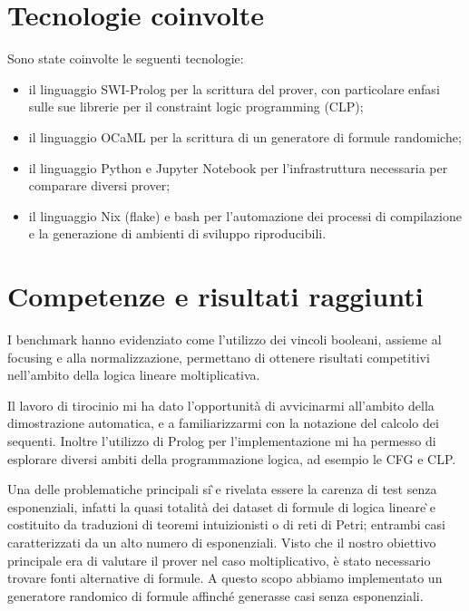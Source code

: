 \documentclass[a4paper, 12pt, italian]{extarticle}
\begin{document}
\section{Tecnologie coinvolte}
Sono state coinvolte le seguenti tecnologie:
\begin{itemize}
	\item il linguaggio SWI-Prolog per la scrittura del prover, con particolare enfasi sulle sue librerie per il constraint logic programming (CLP);
	\item il linguaggio OCaML per la scrittura di un generatore di formule randomiche;
	\item il linguaggio Python e Jupyter Notebook per l’infrastruttura necessaria per comparare diversi prover;
	\item il linguaggio Nix (flake) e bash per l’automazione dei processi di compilazione e la
generazione di ambienti di sviluppo riproducibili.
\end{itemize}

\section{Competenze e risultati raggiunti}
I benchmark hanno evidenziato come l’utilizzo dei vincoli booleani, assieme al focusing e alla normalizzazione, permettano di ottenere risultati competitivi nell’ambito della logica lineare moltiplicativa.

Il lavoro di tirocinio mi ha dato l’opportunità di avvicinarmi all’ambito della dimostrazione automatica, e a familiarizzarmi con la notazione del calcolo dei sequenti.
Inoltre l’utilizzo di Prolog per l’implementazione mi ha permesso di esplorare diversi ambiti della programmazione logica, ad esempio le CFG e CLP.

Una delle problematiche principali si ̀e rivelata essere la carenza di test senza esponenziali, infatti la quasi totalità dei dataset di formule di logica lineare ̀e costituito da traduzioni di teoremi intuizionisti o di reti di Petri; entrambi casi caratterizzati da un alto numero di esponenziali.
Visto che il nostro obiettivo principale era di valutare il prover nel caso moltiplicativo, è stato necessario trovare fonti alternative di formule.
A questo scopo abbiamo implementato un generatore randomico di formule affinché generasse casi senza esponenziali.

\newpage


\end{document}
